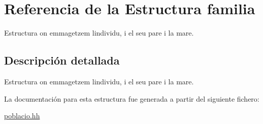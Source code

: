 \hypertarget{structfamilia}{}\section{Referencia de la Estructura familia}
\label{structfamilia}


Estructura on emmagetzem l\textquotesingle{}individu, i el seu pare i la mare.  




\subsection{Descripción detallada}
Estructura on emmagetzem l\textquotesingle{}individu, i el seu pare i la mare. 

La documentación para esta estructura fue generada a partir del siguiente fichero\+:\begin{DoxyCompactItemize}
\item 
\hyperlink{poblacio_8hh}{poblacio.\+hh}\end{DoxyCompactItemize}
